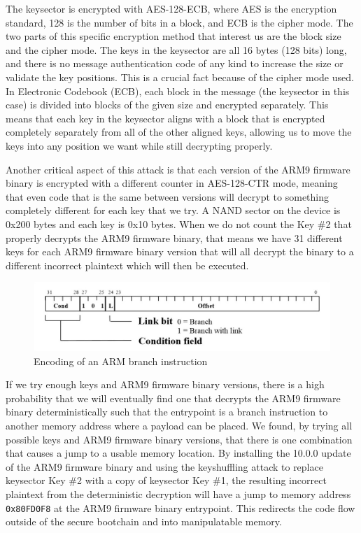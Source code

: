 \documentclass[journal]{IEEEtran}
\begin{document}
The keysector is encrypted with AES-128-ECB, where AES is the encryption
standard, 128 is the number of bits in a block, and ECB is the cipher mode. The
two parts of this specific encryption method that interest us are the block size
and the cipher mode. The keys in the keysector are all 16 bytes (128 bits) long,
and there is no message authentication code of any kind to increase the size or
validate the key positions. This is a crucial fact because of the cipher mode
used. In Electronic Codebook (ECB), each block in the message (the keysector in
this case) is divided into blocks of the given size and encrypted separately.
This means that each key in the keysector aligns with a block that is encrypted
completely separately from all of the other aligned keys, allowing us to move
the keys into any position we want while still decrypting properly.

Another critical aspect of this attack is that each version of the ARM9 firmware
binary is encrypted with a different counter in AES-128-CTR mode, meaning that
even code that is the same between versions will decrypt to something completely
different for each key that we try. A NAND sector on the device is 0x200 bytes
and each key is 0x10 bytes. When we do not count the Key \#2 that properly
decrypts the ARM9 firmware binary, that means we have 31 different keys for each
ARM9 firmware binary version that will all decrypt the binary to a different
incorrect plaintext which will then be executed.

\begin{figure}[h]
  \includegraphics[width=\columnwidth]{./images/branchinstruction.jpg}
  \caption{Encoding of an ARM branch instruction \cite{32c3}}
\end{figure}

If we try enough keys and ARM9 firmware binary versions, there is a high
probability that we will eventually find one that decrypts the ARM9 firmware
binary deterministically such that the entrypoint is a branch instruction to
another memory address where a payload can be placed. We found, by trying all
possible keys and ARM9 firmware binary versions, that there is one combination
that causes a jump to a usable memory location. By installing the 10.0.0 update
of the ARM9 firmware binary and using the keyshuffling attack to replace
keysector Key \#2 with a copy of keysector Key \#1, the resulting incorrect
plaintext from the deterministic decryption will have a jump to memory address
\texttt{0x80FD0F8} at the ARM9 firmware binary entrypoint. This redirects the
code flow outside of the secure bootchain and into manipulatable memory.
\end{document}
